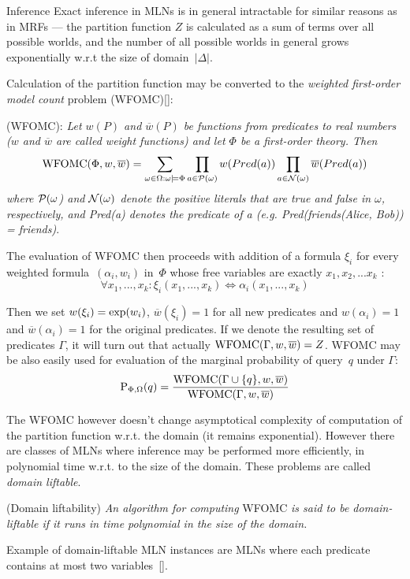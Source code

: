 \sec Inference
Exact inference in MLNs is in general intractable for similar reasons as in MRFs --- the partition function $Z$ is calculated as a sum of terms over all possible worlds, and the number of all possible worlds in general grows exponentially w.r.t the size of domain~$|\Delta|$. 
\par Calculation of the partition function may be converted to the {\it weighted first-order model count} problem (WFOMC)[\rcite[vdBroeck2011]]:
\par{} (WFOMC): {\it Let $w(P)$ and $\overline{w}(P)$ be functions from predicates to real numbers ($w$ and $\overline{w}$ are called weight functions) and let $\Phi$ be a first-order theory. Then}
$$
{\rm WFOMC}(\Phi, w, \overline{w}) = \sum_{\omega \in \Omega: \omega \models \Phi} \prod_{a \in {\cal P}(\omega)} w(Pred(a)) \prod_{a \in {\cal N}(\omega)} \overline{w}(Pred(a))
$$
{\it where ${\cal P}(\omega$) and ${\cal N}(\omega)$ denote the positive literals that are true and false in $\omega$, respectively, and Pred(a) denotes the predicate of a (e.g. Pred(friends(Alice, Bob)) = friends)}.
\par 
The evaluation of WFOMC then proceeds with addition of a formula $\xi_i$ for every weighted formula~$(\alpha_i, w_i)$ in~$\Phi$ whose free variables are exactly $x_1, x_2,...x_k$ :
$$ \forall x_1, ..., x_k: \xi_i(x_1, ... , x_k) \Leftrightarrow \alpha_i(x_1, ... , x_k)$$
\par 
Then we set $w(\xi_i) = {\rm exp}(w_i)$, $\overline{w}(\xi_i) = 1$ for all new predicates and $w(\alpha_i) = 1$ and $\overline{w}(\alpha_i) = 1$ for the original predicates. If we denote the resulting set of predicates $\Gamma$, it will turn out that actually ${\rm WFOMC}(\Gamma,w,\overline{w}) = Z$. WFOMC may be also easily used for evaluation of the marginal probability of query~$q$ under $\Gamma$:
$${\rm P}_{\Phi,\Omega}(q) = {{{\rm WFOMC}(\Gamma \cup \{q\}, w, \overline{w})}\over{{\rm WFOMC}(\Gamma, w, \overline{w})}}$$
\par 
The WFOMC however doesn't change asymptotical complexity of computation of the partition function w.r.t. the domain (it remains exponential). However there are classes of MLNs where inference may be performed more efficiently, in polynomial time w.r.t. to the size of the domain. These problems are called {\it domain liftable}.
\par{} (Domain liftability) {\it An algorithm for computing} WFOMC {\it is
said to be domain-liftable if it runs in time polynomial in the size of the domain.}
\par
Example of domain-liftable MLN instances are MLNs where each predicate contains at most two variables~[\rcite[KuzelkaKun]].

